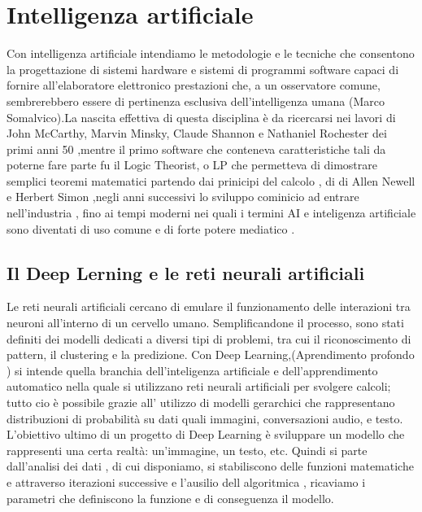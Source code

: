 \section{Intelligenza artificiale }
Con intelligenza artificiale intendiamo le metodologie e le tecniche che consentono la progettazione di sistemi hardware e sistemi di programmi software capaci di fornire all'elaboratore elettronico prestazioni che, a un osservatore comune, sembrerebbero essere di pertinenza esclusiva dell’intelligenza umana
(Marco Somalvico).La nascita effettiva di questa disciplina è da ricercarsi nei lavori di John McCarthy, Marvin Minsky, Claude Shannon e Nathaniel Rochester \cite{McCarthy_Minsky_Rochester_Shannon_2006} dei primi anni 50 ,mentre il primo software che conteneva caratteristiche tali da poterne fare  parte fu il Logic Theorist, o LP che permetteva di dimostrare semplici teoremi matematici partendo dai prinicipi del calcolo , di di Allen Newell e Herbert Simon \cite{10.1145/1455567.1455605},negli anni successivi lo sviluppo cominicio ad entrare nell'industria , fino ai tempi moderni nei quali i termini AI e inteligenza artificiale sono diventati di uso comune e di forte potere mediatico .


\subsection{ Il Deep Lerning e le reti neurali artificiali  }
Le reti neurali artificiali cercano di emulare il funzionamento delle interazioni tra neuroni all’interno di un cervello umano. Semplificandone il processo, sono stati definiti dei modelli dedicati a diversi tipi di problemi, tra cui il riconoscimento di pattern, il clustering e  la predizione. 
Con  Deep Learning,(Aprendimento profondo ) si intende quella branchia dell'inteligenza artificiale e dell'apprendimento automatico nella quale si utilizzano reti neurali artificiali per svolgere calcoli;
tutto cio è possibile grazie all' utilizzo di modelli gerarchici che rappresentano distribuzioni di probabilità su dati quali immagini, conversazioni audio, e testo.
L’obiettivo ultimo di un progetto di Deep Learning è sviluppare un modello che rappresenti una certa realtà: un’immagine, un testo, etc.
Quindi si parte dall'analisi dei dati , di cui disponiamo, si stabiliscono  delle funzioni matematiche e attraverso iterazioni successive e l’ausilio dell algoritmica , ricaviamo i parametri che definiscono la funzione e di conseguenza il modello.
